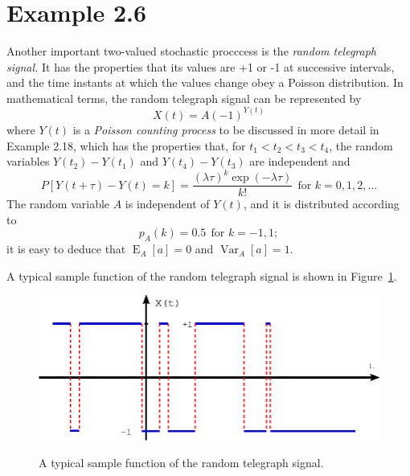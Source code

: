 \documentclass[12pt,letterpaper]{article}
\newcommand{\EE}{\operatorname{E}}
\newcommand{\VV}{\operatorname{Var}}
\begin{document}
\section*{Example 2.6}
Another important two-valued stochastic procccess is the \emph{random telegraph signal.} It has the properties that its values are +1 or -1 at successive intervals, and the time instants at which the values change obey a Poisson distribution. In mathematical terms, the random telegraph signal can be represented by 
\begin{equation}
X(t)=A(-1)^{Y(t)} 
\end{equation}
where $Y(t)$ is a \emph{Poisson counting process} to be discussed in more detail in Example 2.18, which has the properties that, for $t_1 < t_2 < t_3 < t_4$, the random variables $Y(t_2)-Y(t_1)$ and $Y(t_4)-Y(t_3)$ are independent and 
\begin{equation}
P\left[Y(t+\tau) - Y(t) = k \right] = \frac{(\lambda\tau)^k\exp(-\lambda\tau)}{k!} \ \ \text{for } k=0, 1, 2, \ldots \label{eq:PDFY2Y1}
\end{equation}
The random variable $A$ is independent of $Y(t)$, and it is distributed according to
\begin{equation}
p_A(k) = 0.5 \ \ \text{for } k = -1, 1;
\end{equation}
it is easy to deduce that $\EE_A[a] = 0$ and $\VV_A[a] = 1$.

A typical sample function of the random telegraph signal is shown in Figure~\ref{fig:sample_random_telegraph_signal}.
\begin{figure}[hb]
\centering
{}
\includegraphics[width = 0.8 \textwidth]{sample_random_telegraph.eps}\\
\caption{A typical sample function of the random telegraph signal.}
\label{fig:sample_random_telegraph_signal}
\end{figure}
\end{document}
